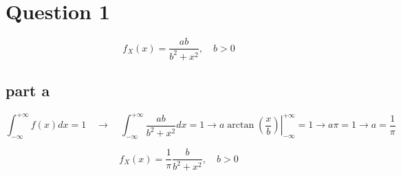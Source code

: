 \section{Question 1}
$$
f_X(x) = \dfrac{ab}{b^2+x^2}, \quad b > 0
$$
\subsection{part a}

$$
\int_{-\infty}^{+\infty} f(x) dx = 1 \quad \rightarrow \quad \int_{-\infty}^{+\infty} \dfrac{ab}{b^2+x^2} dx = 1 \rightarrow \left. a\arctan (\dfrac{x}{b}) 
\right|_{-\infty}^{+\infty} = 1 \rightarrow a\pi = 1 \to a = \dfrac{1}{\pi}
$$

$$
f_X(x) = \dfrac{1}{\pi} \dfrac{b}{b^2+x^2}, \quad b > 0
$$